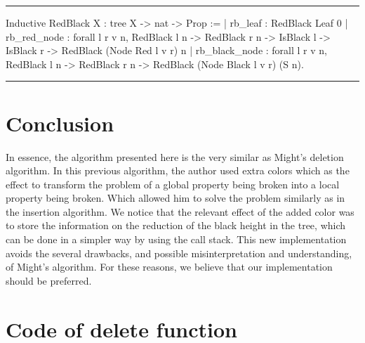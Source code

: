 \documentclass[10pt,a4paper]{article}
\newenvironment{codeblock}%
{\center \minipage{\textwidth} \vspace{6pt} \hrule \vspace{6pt} \minted{ocaml}}%
{\endminted \hrule \vspace{6pt} \endminipage \endcenter}
\begin{document}
\begin{codeblock}
   Inductive RedBlack {X} : tree X -> nat -> Prop :=
   | rb_leaf : RedBlack Leaf 0
   | rb_red_node : forall l r v n,
   RedBlack l n ->
   RedBlack r n ->
   IsBlack l ->
   IsBlack r ->
   RedBlack (Node Red l v r) n
   | rb_black_node : forall l r v n,
   RedBlack l n ->
   RedBlack r n ->
   RedBlack (Node Black l v r) (S n).

\end{codeblock}


\section{Conclusion}

In essence, the algorithm presented here is the very similar as Might's deletion algorithm.
In this previous algorithm, the author used extra colors which as the effect to transform the problem of a global property being broken into a local property being broken.
Which allowed him to solve the problem similarly as in the insertion algorithm.
We notice that the relevant effect of the added color was to store the information on the reduction of the black height in the tree, which can be done in a simpler way by using the call stack.
This new implementation avoids the several drawbacks, and possible misinterpretation and understanding, of Might's algorithm.
For these reasons, we believe that our implementation should be preferred.

{}


\newpage

\appendix

\section{Code of delete function}
\label{sec:ann1}
\end{document}
